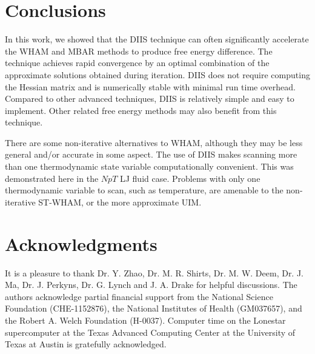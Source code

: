 \documentclass[reprint,aip,jcp,superscriptaddress]{revtex4-1}
\begin{document}
\section{Conclusions}



In this work, we showed that the DIIS technique
can often significantly accelerate
the WHAM and MBAR methods to produce free energy difference.
%
The technique achieves rapid convergence
by an optimal combination of the approximate
solutions obtained during iteration.
%
DIIS does not require computing the Hessian matrix
and is numerically stable
with minimal run time overhead.
%
Compared to other advanced techniques\cite{
shirts2008, zhu2012},
DIIS is relatively simple and easy to implement.
%
Other related free energy methods\cite{
shen1991, woolf1994, *crouzy1994, roux1995}
may also benefit from this technique.
%



There are some non-iterative alternatives to WHAM,
although they may be less general and/or accurate
in some aspect.
%
The use of DIIS makes scanning more than one thermodynamic state variable
computationally convenient.
%
This was demonstrated here in the $NpT$ LJ fluid case.
%
Problems with only one thermodynamic variable to scan, such as temperature,
are amenable to the non-iterative ST-WHAM,
or the more approximate UIM.
%




\section{Acknowledgments}





It is a pleasure to thank
Dr. Y. Zhao,
Dr. M. R. Shirts,
Dr. M. W. Deem,
Dr. J. Ma,
Dr. J. Perkyns, Dr. G. Lynch and J. A. Drake
for helpful discussions.
%
The authors acknowledge
partial financial support from
the National Science Foundation (CHE-1152876),
the National Institutes of Health (GM037657),
and
the Robert A. Welch Foundation (H-0037).
%
Computer time on the Lonestar supercomputer
at the Texas Advanced Computing Center
at the University of Texas at Austin
is gratefully acknowledged.
\end{document}
